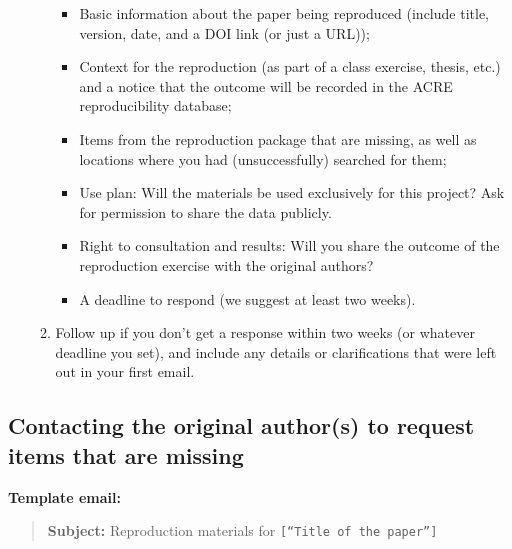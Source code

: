 \documentclass[]{book}
\providecommand{\tightlist}{%
  \setlength{\itemsep}{0pt}\setlength{\parskip}{0pt}}
\begin{document}
\begin{enumerate}
\begin{enumerate}
    \begin{itemize}
    \tightlist
    \item
      Basic information about the paper being reproduced (include title, version, date, and a DOI link (or just a URL));\\
    \item
      Context for the reproduction (as part of a class exercise, thesis, etc.) and a notice that the outcome will be recorded in the ACRE reproducibility database;\\
    \item
      Items from the reproduction package that are missing, as well as locations where you had (unsuccessfully) searched for them;\\
    \item
      Use plan: Will the materials be used exclusively for this project? Ask for permission to share the data publicly.\\
    \item
      Right to consultation and results: Will you share the outcome of the reproduction exercise with the original authors?\\
    \item
      A deadline to respond (we suggest at least two weeks).
    \end{itemize}
  \item
    Follow up if you don't get a response within two weeks (or whatever deadline you set), and include any details or clarifications that were left out in your first email.
  \end{enumerate}
\end{enumerate}

\hypertarget{contacting-the-original-authors-to-request-items-that-are-missing}{%
\subsection{Contacting the original author(s) to request items that are missing}\label{contacting-the-original-authors-to-request-items-that-are-missing}}

\textbf{Template email:}

\begin{quote}
\textbf{Subject:} Reproduction materials for \texttt{{[}“Title\ of\ the\ paper”{]}}
\end{quote}
\end{document}
